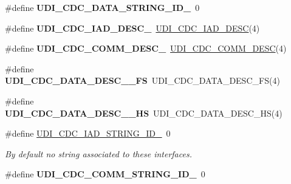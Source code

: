 \begin{DoxyCompactItemize}
\item 
\hypertarget{group__udi__cdc__group__desc_ga63c6e244e77ea322c0e0f12b8e30d378}{\#define {\bfseries U\-D\-I\-\_\-\-C\-D\-C\-\_\-\-D\-A\-T\-A\-\_\-\-S\-T\-R\-I\-N\-G\-\_\-\-I\-D\-\_}~0}\label{group__udi__cdc__group__desc_ga63c6e244e77ea322c0e0f12b8e30d378}

\item 
\hypertarget{group__udi__cdc__group__desc_ga6f9db09de6b4d59ca3249052ee4f92f1}{\#define {\bfseries U\-D\-I\-\_\-\-C\-D\-C\-\_\-\-I\-A\-D\-\_\-\-D\-E\-S\-C\-\_}~\hyperlink{group__udi__cdc__group__desc_ga39928ecb0423aff5f7ab70ae98eb2c94}{U\-D\-I\-\_\-\-C\-D\-C\-\_\-\-I\-A\-D\-\_\-\-D\-E\-S\-C}(4)}\label{group__udi__cdc__group__desc_ga6f9db09de6b4d59ca3249052ee4f92f1}

\item 
\hypertarget{group__udi__cdc__group__desc_ga9e6e5fc2cc8ebf76a18c5b402abf0886}{\#define {\bfseries U\-D\-I\-\_\-\-C\-D\-C\-\_\-\-C\-O\-M\-M\-\_\-\-D\-E\-S\-C\-\_}~\hyperlink{group__udi__cdc__group__desc_gac76fc1207bccd36e9851945206c063c0}{U\-D\-I\-\_\-\-C\-D\-C\-\_\-\-C\-O\-M\-M\-\_\-\-D\-E\-S\-C}(4)}\label{group__udi__cdc__group__desc_ga9e6e5fc2cc8ebf76a18c5b402abf0886}

\item 
\hypertarget{group__udi__cdc__group__desc_ga1acb45701e8af970a619282cfc19c908}{\#define {\bfseries U\-D\-I\-\_\-\-C\-D\-C\-\_\-\-D\-A\-T\-A\-\_\-\-D\-E\-S\-C\-\_\-\_\-\-F\-S}~U\-D\-I\-\_\-\-C\-D\-C\-\_\-\-D\-A\-T\-A\-\_\-\-D\-E\-S\-C\-\_\-\-F\-S(4)}\label{group__udi__cdc__group__desc_ga1acb45701e8af970a619282cfc19c908}

\item 
\hypertarget{group__udi__cdc__group__desc_gad8f04321ac7f468d10d112d777f35230}{\#define {\bfseries U\-D\-I\-\_\-\-C\-D\-C\-\_\-\-D\-A\-T\-A\-\_\-\-D\-E\-S\-C\-\_\-\_\-\-H\-S}~U\-D\-I\-\_\-\-C\-D\-C\-\_\-\-D\-A\-T\-A\-\_\-\-D\-E\-S\-C\-\_\-\-H\-S(4)}\label{group__udi__cdc__group__desc_gad8f04321ac7f468d10d112d777f35230}

\item 
\hypertarget{group__udi__cdc__group__desc_gad3cea7791b472f722b48599d057fb116}{\#define \hyperlink{group__udi__cdc__group__desc_gad3cea7791b472f722b48599d057fb116}{U\-D\-I\-\_\-\-C\-D\-C\-\_\-\-I\-A\-D\-\_\-\-S\-T\-R\-I\-N\-G\-\_\-\-I\-D\-\_}~0}\label{group__udi__cdc__group__desc_gad3cea7791b472f722b48599d057fb116}

\begin{DoxyCompactList}\small\item\em By default no string associated to these interfaces. \end{DoxyCompactList}\item 
\hypertarget{group__udi__cdc__group__desc_gabafccdd0760be1e47bf0b7e42fbf8271}{\#define {\bfseries U\-D\-I\-\_\-\-C\-D\-C\-\_\-\-C\-O\-M\-M\-\_\-\-S\-T\-R\-I\-N\-G\-\_\-\-I\-D\-\_}~0}\label{group__udi__cdc__group__desc_gabafccdd0760be1e47bf0b7e42fbf8271}


\end{DoxyCompactItemize}
